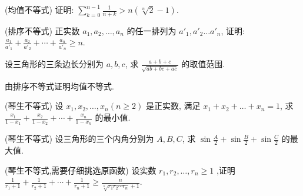\documentclass[a4paper , final]{ctexart}
\newenvironment{problem}[1]{%
  \item #1
  \par
  \vspace{8cm}
}{}
\begin{document}
\begin{problems}
  \begin{problem}
    {(均值不等式)
      证明: $\sum_{k=0}^{n-1} \frac{1}{n+k}>n(\sqrt[n]{2}-1)$.
    }
  \end{problem}

  \begin{problem}
    {(排序不等式)
      正实数 $a_1,a_2,\ldots,a_n$ 的任一排列为 ${a'}_1,{a'}_2\ldots {a'}_n$, 证明: $\frac{a_1}{{a'}_1}+\frac{a_2}{{a'}_2}+\cdots+\frac{a_n}{{a'}_n}\geq n$.
    }
  \end{problem}

  \begin{problem}
    {
      设三角形的三条边长分别为 $a,b,c$, 求 $\frac{a+b+c}{\sqrt{ab+bc+ac}}$ 的取值范围.
    }
  \end{problem}

  \begin{problem}
    {
      由排序不等式证明均值不等式.
    }
  \end{problem}

  \begin{problem}
    {(琴生不等式)
      设 $x_1,x_2,\ldots,x_n(n\ge 2)$ 是正实数, 满足 $x_1+x_2+\ldots+x_n=1$, 求 $\frac{x_1}{1-x_1}+\frac{x_2}{1-x_2}+\cdots+\frac{x_n}{1-x_n}$ 的最小值.
    }
  \end{problem}

  \begin{problem}
    {(琴生不等式)
      设三角形的三个内角分别为 $A,B,C$, 求 $\sin{\frac{A}{2}}+\sin{\frac{B}{2}}+\sin{\frac{C}{2}}$ 的最大值.
    }
  \end{problem}

  \begin{problem}
    {(琴生不等式,需要仔细挑选原函数)
      设实数 $r_1,r_2,\ldots,r_n\ge 1$ ,证明 $\frac{1}{r_1+1}+\frac{1}{r_2+1}+\cdots+\frac{1}{r_n+1}\ge \frac{n}{\sqrt[n]{r_1r_2\cdots r_n}+1}$.
    }
  \end{problem}
\end{problems}
\end{document}
